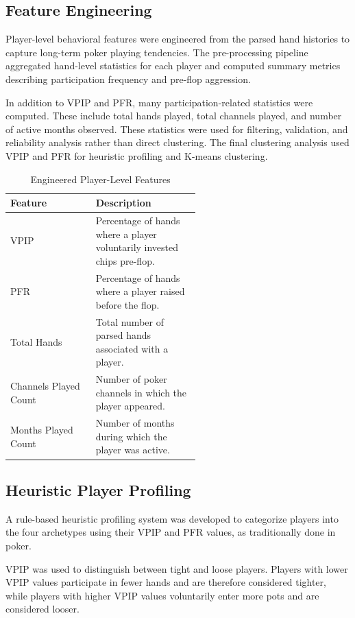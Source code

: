 \documentclass[sigconf]{acmart}
\begin{document}
\subsection{Feature Engineering}
Player-level behavioral features were engineered from the parsed hand histories to capture long-term poker playing tendencies. The pre-processing pipeline aggregated hand-level statistics for each player and computed summary metrics describing participation frequency and pre-flop aggression.

In addition to VPIP and PFR, many participation-related statistics were computed. These include total hands played, total channels played, and number of active months observed. These statistics were used for filtering, validation, and reliability analysis rather than direct clustering. The final clustering analysis used VPIP and PFR for heuristic profiling and K-means clustering. 

\begin{table}[t]
  \caption{Engineered Player-Level Features}
  \label{tab:features}
  \centering
  \begin{tabular}{lp{0.55\linewidth}}
    \toprule
    Feature & Description \\
    \midrule
    VPIP & Percentage of hands where a player voluntarily invested chips pre-flop. \\
    PFR & Percentage of hands where a player raised before the flop. \\
    Total Hands & Total number of parsed hands associated with a player. \\
    Channels Played Count & Number of poker channels in which the player appeared. \\
    Months Played Count & Number of months during which the player was active. \\
    \bottomrule
  \end{tabular}
\end{table}

\subsection{Heuristic Player Profiling}
A rule-based heuristic profiling system was developed to categorize players into the four archetypes using their VPIP and PFR values, as traditionally done in poker. 

VPIP was used to distinguish between tight and loose players. Players with lower VPIP values participate in fewer hands and are therefore considered tighter, while players with higher VPIP values voluntarily enter more pots and are considered looser.
\end{document}
